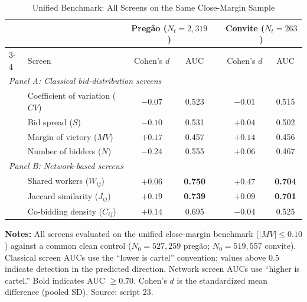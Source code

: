 \begin{table}[htbp]
\centering
\caption{Unified Benchmark: All Screens on the Same Close-Margin Sample}\label{tab:unified}
\begin{tabular}{llccccc}
\toprule
& & \multicolumn{2}{c}{Pregão ($N_t = 2{,}319$)} & & \multicolumn{2}{c}{Convite ($N_t = 263$)} \\
\cmidrule{3-4} \cmidrule{6-7}
& Screen & Cohen's $d$ & AUC & & Cohen's $d$ & AUC \\
\midrule
\multicolumn{7}{l}{\emph{Panel A: Classical bid-distribution screens}} \\[3pt]
& Coefficient of variation ($CV$) & $-0.07$ & 0.523 & & $-0.01$ & 0.515 \\
& Bid spread ($S$) & $-0.10$ & 0.531 & & $+0.04$ & 0.502 \\
& Margin of victory ($MV$) & $+0.17$ & 0.457 & & $+0.14$ & 0.456 \\
& Number of bidders ($N$) & $-0.24$ & 0.555 & & $+0.06$ & 0.467 \\[6pt]
\multicolumn{7}{l}{\emph{Panel B: Network-based screens}} \\[3pt]
& Shared workers ($W_{ij}$) & $+0.06$ & \textbf{0.750} & & $+0.47$ & \textbf{0.704} \\
& Jaccard similarity ($J_{ij}$) & $+0.19$ & \textbf{0.739} & & $+0.09$ & \textbf{0.701} \\
& Co-bidding density ($C_{ij}$) & $+0.14$ & 0.695 & & $-0.04$ & 0.525 \\
\bottomrule
\end{tabular}
\vspace{0.5em}
\begin{minipage}{0.95\textwidth}
\scriptsize{\textbf{Notes:} All screens evaluated on the unified close-margin benchmark ($\lvert MV \rvert \le 0.10$) against a common clean control ($N_0 = 527{,}259$ pregão; $N_0 = 519{,}557$ convite). Classical screen AUCs use the ``lower is cartel'' convention; values above 0.5 indicate detection in the predicted direction. Network screen AUCs use ``higher is cartel.'' Bold indicates AUC $\ge 0.70$. Cohen's $d$ is the standardized mean difference (pooled SD). Source: script 23.\par}
\end{minipage}
\end{table}
